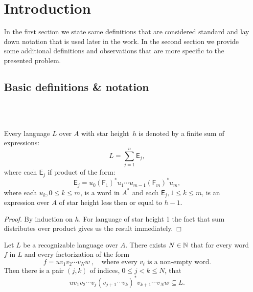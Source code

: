 \chapter{Introduction}

In the first section we state same definitions that are considered standard and lay down notation that is used later in the work. In the second section we provide some additional definitions and observations that are more specific to the presented problem.

\section{Basic definitions \& notation}

\begin{defn} \\
    \\
\end{defn}

\begin{defn}
\end{defn}

\begin{lemma}\label{lm:distributivity}
    Every language $L$ over $A$ with star height~$h$ is denoted by a finite sum of expressions:
    \[
        L = \sum_{j=1}^n \mathsf{E}_j,
    \]
    where each $\mathsf{E}_j$ if product of the form:
    \[
        \mathsf{E}_j = u_0{(\mathsf{F}_1)}^*u_1 \dotsm u_{m-1}{(\mathsf{F}_m)}^*u_m,
    \]
    where each $u_k, 0 \leq k \leq m$, is a word in $A^*$ and each $\mathsf{E}_j, 1 \leq k \leq m$, is an expression over $A$ of star height less then or equal to $h-1$.
\end{lemma}

\begin{proof}
    By induction on $h$. For language of star height 1 the fact that sum distributes over product gives us the result immediately. 
\end{proof}

\begin{lemma}\label{lm:block_star_lemma}
    Let $L$ be a recognizable language over $A$. There exists $N \in \mathbb{N}$ that for every word $f$ in $L$ and every factorization of the form
    \[
        f = u v_1 v_2 \dotsm v_N w \; , \quad \text{where every $v_i$ is a non-empty word.}
    \]
    Then there is a pair $(j,k)$ of indices, $0 \leq j < k \leq N$, that
    \[
        u v_1 v_2 \dotsm v_j {(v_{j+1} \dotsm v_k)}^* v_{k+1} \dotsm v_N w \subseteq L.
    \]
\end{lemma}

